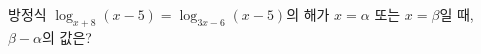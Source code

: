 방정식 $\log_{x+8} (x-5)=\log_{3x-6} (x-5)$의 해가 $x=\alpha$ 또는 $x=\beta$일 때, $\beta-\alpha$의 값은? \dmcondfill{$\alpha<\beta$}{}
